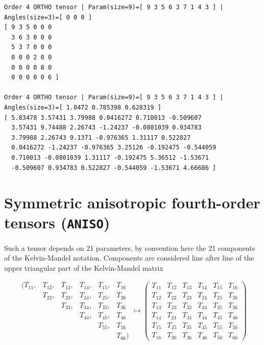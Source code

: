 \documentclass[
  a4paper,
  numbers=noendperiod,
  DIV=12]{scrreprt}
\begin{document}
\begin{verbatim}
Order 4 ORTHO tensor | Param(size=9)=[ 9 3 5 6 3 7 1 4 3 ] | Angles(size=3)=[ 0 0 0 ]
[ 9 3 5 0 0 0 
  3 6 3 0 0 0 
  5 3 7 0 0 0 
  0 0 0 2 0 0 
  0 0 0 0 8 0 
  0 0 0 0 0 6 ]

Order 4 ORTHO tensor | Param(size=9)=[ 9 3 5 6 3 7 1 4 3 ] | Angles(size=3)=[ 1.0472 0.785398 0.628319 ]
[ 5.83478 3.57431 3.79988 0.0416272 0.710013 -0.509607 
  3.57431 9.74488 2.26743 -1.24237 -0.0801039 0.934783 
  3.79988 2.26743 9.1371 -0.976365 1.31117 0.522827 
  0.0416272 -1.24237 -0.976365 3.25126 -0.192475 -0.544059 
  0.710013 -0.0801039 1.31117 -0.192475 5.36512 -1.53671 
  -0.509607 0.934783 0.522827 -0.544059 -1.53671 4.66686 ]
\end{verbatim}

\section{\texorpdfstring{Symmetric anisotropic fourth-order tensors
(\texttt{ANISO})}{Symmetric anisotropic fourth-order tensors (ANISO)}}\label{symmetric-anisotropic-fourth-order-tensors-aniso}

Such a tensor depends on 21 parameters, by convention here the 21
components of the Kelvin-Mandel notation. Components are considered line
after line of the upper triangular part of the Kelvin-Mandel matrix

\[
\begin{array}{cccccc}
   (T_{11},&T_{12},&T_{13},&T_{14},&T_{15},&T_{16}\\
                          &T_{22},&T_{23},&T_{24},&T_{25},&T_{26}\\
                          &            &T_{33},&T_{34},&T_{35},&T_{36}\\
                          &            &             &T_{44},&T_{45},&T_{46}\\
                          &            &             &            &T_{55},&T_{56}\\
                          &            &             &            &            &T_{66})
   \end{array}
\mapsto
\left(
\begin{array}{cccccc}
     T_{11}&T_{12}&T_{13}&T_{14}&T_{15}&T_{16}\\
     T_{12}&T_{22}&T_{23}&T_{24}&T_{25}&T_{26}\\
     T_{13}&T_{23}&T_{33}&T_{34}&T_{35}&T_{36}\\
     T_{14}&T_{24}&T_{34}&T_{44}&T_{45}&T_{46}\\
     T_{15}&T_{25}&T_{35}&T_{45}&T_{55}&T_{56}\\
     T_{16}&T_{26}&T_{36}&T_{46}&T_{56}&T_{66}
\end{array}
\right)
\]
\end{document}
